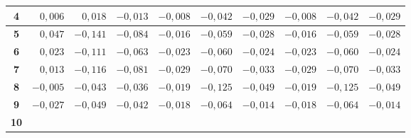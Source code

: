 \begin{table} [htbp]
{\begin{tabular}{|c|rrr|rrr|rrr|}
			\textbf{4}              		    & 
			\multicolumn{1}{r|}{$ 0,006$}       & \multicolumn{1}{r|}{$ 0,018$}       & $-0,013$                            & \multicolumn{1}{r|}{$-0,008$}       & \multicolumn{1}{r|}{$-0,042$}       & $-0,029$                            & \multicolumn{1}{r|}{$-0,008$}       & \multicolumn{1}{r|}{$-0,042$}       & $-0,029$                            \\ \hline
			\textbf{5}                  & 
			\multicolumn{1}{r|}{$ 0,047$}       & \multicolumn{1}{r|}{$-0,141$}       & $-0,084$                            & \multicolumn{1}{r|}{$-0,016$}       & \multicolumn{1}{r|}{$-0,059$}       & $-0,028$                            & \multicolumn{1}{r|}{$-0,016$}       & \multicolumn{1}{r|}{$-0,059$}       & $-0,028$                            \\ \hline
			\textbf{6}              		    & 
			\multicolumn{1}{r|}{$ 0,023$}       & \multicolumn{1}{r|}{$-0,111$}       & $-0,063$                            & \multicolumn{1}{r|}{$-0,023$}       & \multicolumn{1}{r|}{$-0,060$}       & $-0,024$                            & \multicolumn{1}{r|}{$-0,023$}       & \multicolumn{1}{r|}{$-0,060$}       & $-0,024$                            \\ \hline
			\textbf{7}              		    & 
			\multicolumn{1}{r|}{$ 0,013$}       & \multicolumn{1}{r|}{$-0,116$}       & $-0,081$                            & \multicolumn{1}{r|}{$-0,029$}       & \multicolumn{1}{r|}{$-0,070$}       & $-0,033$                            & \multicolumn{1}{r|}{$-0,029$}       & \multicolumn{1}{r|}{$-0,070$}       & $-0,033$                            \\ \hline
			\textbf{8}             			    & 
			\multicolumn{1}{r|}{$-0,005$}       & \multicolumn{1}{r|}{$-0,043$}       & $-0,036$                            & \multicolumn{1}{r|}{$-0,019$}       & \multicolumn{1}{r|}{$-0,125$}       & $-0,049$                            & \multicolumn{1}{r|}{$-0,019$}       & \multicolumn{1}{r|}{$-0,125$}       & $-0,049$                            \\ \hline
			\textbf{9}                 			& 
			\multicolumn{1}{r|}{$-0,027$}       & \multicolumn{1}{r|}{$-0,049$}       & $-0,042$                            & \multicolumn{1}{r|}{$-0,018$}       & \multicolumn{1}{r|}{$-0,064$}       & $-0,014$                            & \multicolumn{1}{r|}{$-0,018$}       & \multicolumn{1}{r|}{$-0,064$}       & $-0,014$                            \\ \hline
			\textbf{10}                 		& 

\end{tabular}}
\end{table}
